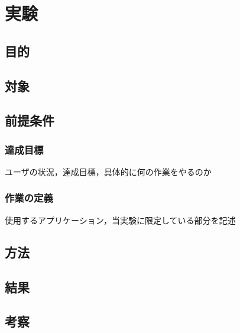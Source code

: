 \chapter{実験}

\section{目的}

\section{対象}

\section{前提条件}

\subsection{達成目標}
ユーザの状況，達成目標，具体的に何の作業をやるのか

\subsection{作業の定義}
使用するアプリケーション，当実験に限定している部分を記述

\section{方法}

\section{結果}

\section{考察}



